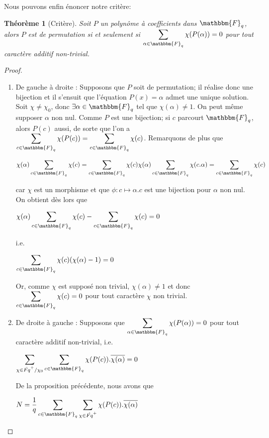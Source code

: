 \documentclass[12pt]{article}
\newcommand{\Fq}{\mathbbm{F}_q}
\newtheorem{thm}{Théorème}
\theoremstyle{definition}\newtheorem{defn}{Définition}
\theoremstyle{definition}\newtheorem{exm}{Exemple}
\theoremstyle{definition}\newtheorem{rem}{Remarque}
\theoremstyle{definition}\newtheorem{algo}{Algorithme}
\theoremstyle{remark}\newtheorem{exo}{Exercice}
\theoremstyle{remark}\newtheorem{note}{Note}
\theoremstyle{remark}\newtheorem{nota}{Notation}
\begin{document}
Nous pouvons enfin énoncer notre critère:

\begin{thm}[Critère]
Soit $P$ un polynôme à coefficients dans $\Fq$, alors $P$ est de permutation si et seulement si $\displaystyle\sum_{\alpha \in \Fq} \chi(P(\alpha)) = 0$ pour tout caractère additif non-trivial.
\end{thm}

\begin{proof}
	\begin{enumerate}[label = \roman*)]
		\item De gauche à droite : Supposons que $P$ soit de permutation; il réalise donc une bijection et il s'ensuit que l'équation $P(x) = \alpha$ admet une unique solution. Soit $\chi \neq \chi_0$, donc $\exists \alpha \in \Fq$ tel que $\chi(\alpha)\neq 1$. On peut même supposer $\alpha$ non nul. Comme $P$ est une bijection; si $c$ parcourt $\Fq$, alors $P(c)$ aussi, de sorte que l'on a $\displaystyle\sum_{c\in\Fq}\chi(P(c)) = \displaystyle\sum_{c\in\Fq}\chi(c)$. \newline
Remarquons de plus que
\begin{center}$\chi(\alpha)\displaystyle\sum_{c\in\Fq}\chi(c) = \displaystyle\sum_{c\in\Fq}\chi(c)\chi(\alpha) \displaystyle\sum_{c\in\Fq}\chi(c.\alpha) =\displaystyle\sum_{c\in\Fq}\chi(c)$\end{center}
car $\chi$ est un morphisme et que $\phi :c \longmapsto \alpha.c$ est une bijection pour $\alpha$ non nul.
On obtient dès lors que
\begin{center} 
$\chi(\alpha)\displaystyle\sum_{c\in\Fq}\chi(c) - \displaystyle\sum_{c\in\Fq}\chi(c) =0$
\end{center}
i.e.
\begin{center}
$\displaystyle\sum_{c\in\Fq}\chi(c)(\chi(\alpha) -1) = 0$
\end{center}
Or, comme $
\chi$ est supposé non trivial, $\chi(\alpha) \neq 1$ et donc $\displaystyle\sum_{c\in\Fq}\chi(c) = 0$ pour tout caractère $\chi$ non trivial.
		\item De droite à gauche : Supposons que $\displaystyle\sum_{\alpha \in \Fq} \chi(P(\alpha)) = 0$ pour tout caractère additif non-trivial, i.e. 
		\begin{center} $\displaystyle	\sum_{\chi \in \hat{Fq}^+/\chi_0} \sum_{c\in\Fq} \chi(P(c)).\overline{\chi(\alpha)}=0$ \end{center}
De la proposition précédente, nous avons que 
\begin{center} $N = \displaystyle \frac{1}{q} \sum_{c\in\Fq}\sum_{\chi \in \hat{Fq}^+} \chi(P(c)).\overline{\chi(\alpha)}$ \end{center}

\end{enumerate}
\end{proof}
\end{document}
